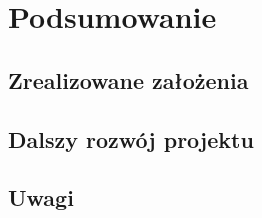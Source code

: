 \chapter{Podsumowanie}
\section{Zrealizowane założenia}
\section{Dalszy rozwój projektu}
\section{Uwagi}
